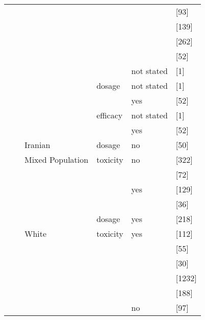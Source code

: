 \begin{center}
\begin{longtable}[H]{|l|l|l|l||l||l|}
\cline{6-6}
& & & & & \citeauthor{Liang_2013} \citeyear{Liang_2013} [93] \\
\cline{6-6}
& & & & & \citeauthor{Vannaprasaht_2009} \citeyear{Vannaprasaht_2009} [139] \\
\cline{6-6}
& & & & & \citeauthor{Zelinkova_2006} \citeyear{Zelinkova_2006} [262] \\
\cline{6-6}
& & & & & \citeauthor{Gardiner_2008} \citeyear{Gardiner_2008} [52] \\
\cline{5-6}
& & & & not stated & \citeauthor{pmid12477776} \citeyear{pmid12477776} [1] \\
\cline{4-6}
& & & dosage & not stated & \citeauthor{pmid12477776} \citeyear{pmid12477776} [1] \\
\cline{5-6}
& & & & yes & \citeauthor{Gardiner_2008} \citeyear{Gardiner_2008} [52] \\
\cline{4-6}
& & & efficacy & not stated & \citeauthor{pmid12477776} \citeyear{pmid12477776} [1] \\
\cline{5-6}
& & & & yes & \citeauthor{Gardiner_2008} \citeyear{Gardiner_2008} [52] \\
\cline{3-6}
& & Iranian & dosage & no & \citeauthor{pmid21819368} \citeyear{pmid21819368} [50] \\
\cline{3-6}
& & Mixed Population & toxicity & no & \citeauthor{Newman_2011} \citeyear{Newman_2011} [322] \\
\cline{6-6}
& & & & & \citeauthor{RIDDER_2006} \citeyear{RIDDER_2006} [72] \\
\cline{5-6}
& & & & yes & \citeauthor{Heckmann_2005} \citeyear{Heckmann_2005} [129] \\
\cline{6-6}
& & & & & \citeauthor{Formea_2004} \citeyear{Formea_2004} [36] \\
\cline{4-6}
& & & dosage & yes & \citeauthor{Fabre_2004} \citeyear{Fabre_2004} [218] \\
\cline{3-6}
& & White & toxicity & yes & \citeauthor{pmid16044099} \citeyear{pmid16044099} [112] \\
\cline{6-6}
& & & & & \citeauthor{Hindorf_2004} \citeyear{Hindorf_2004} [55] \\
\cline{6-6}
& & & & & \citeauthor{pmid10798786} \citeyear{pmid10798786} [30] \\
\cline{6-6}
& & & & & \citeauthor{pmid20593505} \citeyear{pmid20593505} [1232] \\
\cline{6-6}
& & & & & \citeauthor{Wroblova_2012} \citeyear{Wroblova_2012} [188] \\
\cline{5-6}
& & & & no & \citeauthor{Gazouli_2010} \citeyear{Gazouli_2010} [97] \\

\end{longtable}
\end{center}
